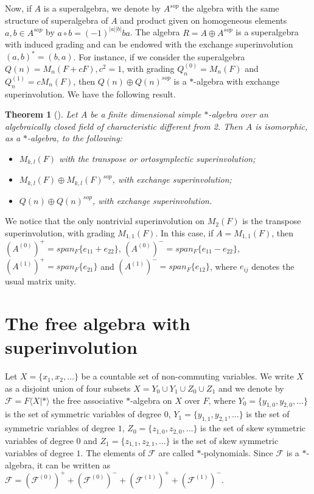 \documentclass[11pt]{amsart}
\newtheorem{theorem}{Theorem}[section]
\theoremstyle{definition}
\theoremstyle{remark}
\begin{document}
	Now, if $A$ is a superalgebra, we denote by $A^{sop}$ the algebra with the same structure of superalgebra of $A$ and product given on homogeneous elements $a,b\in A^{sop}$ by $a\circ b=(-1)^{|a||b|}ba$. The algebra $R=A\oplus A^{sop}$ is a superalgebra with induced grading and can be endowed with the exchange superinvolution $(a,b)^*=(b,a)$. For instance, if we consider the superalgebra $Q(n)=M_n(F+cF),c^2=1$, with grading $Q_n^{(0)}=M_n(F)$ and $Q_n^{(1)}=cM_n(F)$, then $Q(n)\oplus Q(n)^{sop}$ is a $*$-algebra with exchange superinvolution. We have the following result.
	
	\begin{theorem}[\cite{Bahturin, Shest, Racine}]
		Let $A$ be a finite dimensional simple $*$-algebra over an algebraically closed field of characteristic different from 2. Then $A$ is isomorphic, as a $\ast$-algebra, to the following:
		\begin{itemize}
			\item[1.] $M_{k,l}(F)$ with the transpose or ortosymplectic superinvolution;
			\item[2.] $M_{k,l}(F)\oplus M_{k,l}(F)^{sop}$, with exchange superinvolution;
			\item[3.] $Q(n)\oplus Q(n)^{sop}$, with exchange superinvolution.
		\end{itemize}
	\end{theorem}
	
	We notice that the only nontrivial superinvolution on $M_2(F)$ is the transpose superinvolution, with grading $M_{1,1}(F)$. In this case, if $A=M_{1,1}(F)$, then $(A^{(0)})^+=span_F\{e_{11}+e_{22}\}$, $(A^{(0)})^-=span_F\{e_{11}-e_{22}\}$, $(A^{(1)})^+=span_F\{e_{21}\}$ and $(A^{(1)})^-=span_F\{e_{12}\}$, where $e_{ij}$ denotes the usual matrix unity.
	
	
	\section{The free algebra with superinvolution}
	
	Let $X = \{x_{1}, x_{2}, \ldots \}$ be a countable set of non-commuting variables. We write $X$ as a disjoint union of four subsets $\displaystyle X = Y_{0} \cup Y_{1} \cup Z_{0} \cup Z_{1}$ and we denote by $\mathcal{F} = F \langle X|* \rangle$ the free associative $*$-algebra on $X$ over $F$, where $Y_{0} = \{y_{1,0}, y_{2,0}, \ldots \}$ is the set of symmetric variables of degree $0$, $Y_{1} = \{y_{1,1}, y_{2,1}, \ldots \}$ is the set of symmetric variables of degree $1$, $Z_{0} = \{z_{1,0}, z_{2,0}, \ldots \}$ is the set of skew symmetric variables of degree  $0$ and $Z_{1} = \{z_{1,1}, z_{2,1}, \ldots \}$ is the set of skew symmetric variables of degree  $1$. The elements of $\mathcal{F}$ are called $*$-polynomials. Since $\mathcal{F}$ is a $\ast$-algebra, it can be written as $\mathcal{F}=(\mathcal{F}^{(0)})^+ +(\mathcal{F}^{(0)})^-+(\mathcal{F}^{(1)})^+ +(\mathcal{F}^{(1)})^-$.
	
\end{document}
